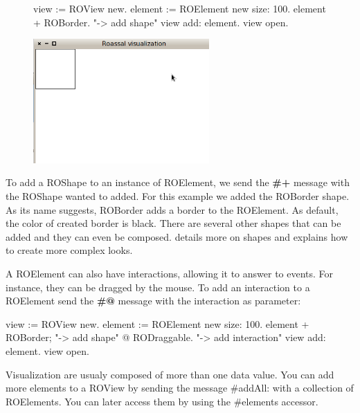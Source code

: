 \documentclass[a4paper,10pt,twoside]{book}
\begin{document}
\begin{figure}[H]
      \begin{minipage}[t]{0.5\textwidth}
      \vspace{0pt}
\begin{code}{}
view := ROView new.
element := ROElement new size: 100.
element 
	+ ROBorder. "-> add shape"
view add: element.
view open.
\end{code}
   \end{minipage}
   \hfill
   \begin{minipage}[t]{0.6\textwidth}
      \vspace{0pt} \raggedright
       \centering
		\includegraphics[width=0.6\textwidth]{ex2}
   \end{minipage}
\label{fig:ex2}
\end{figure}

To add a ROShape to an instance of ROElement, we send the \textbf{\#+} message with the ROShape wanted to added. For this example we added the ROBorder shape. As its name suggests, ROBorder adds a border to the ROElement. As default, the color of created border is black. There are several other shapes that can be added and they can even be composed.  details more on shapes and explains how to create more complex looks.

A ROElement can also have interactions, allowing it to answer to events. For instance, they can be dragged by the mouse. To add an interaction to a ROElement send the \textbf{\#@} message with the interaction as parameter: 

\begin{code}{}
view := ROView new.
element := ROElement new size: 100.
element 
	+ ROBorder; "-> add shape"
	@ RODraggable. "-> add interaction"
view add: element.
view open.
\end{code}

Visualization are usualy composed of more than one data value. You can add more elements to a ROView by sending the message \#addAll: with a collection of ROElements. You can later access them by using the \#elements accessor. 
\end{document}
